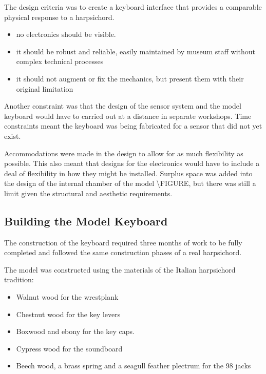 The design criteria was to create a keyboard interface that provides a
comparable physical response to a harpsichord.


\begin{itemize}
\item
  no electronics should be visible.
\item
  it should be robust and reliable, easily maintained by museum staff
  without complex technical processes
\item
  it should not augment or fix the mechanics, but present them with
  their original limitation
\end{itemize}

Another constraint was that the design of the sensor system and the
model keyboard would have to carried out at a distance in separate
workshops. Time constraints meant the keyboard was being fabricated for
a sensor that did not yet exist.

Accommodations were made in the design to allow for as much flexibility
as possible. This also meant that designs for the electronics would have
to include a deal of flexibility in how they might be installed. Surplus
space was added into the design of the internal chamber of the model
\textbackslash FIGURE, but there was still a limit given the structural
and aesthetic requirements.

\subsection{Building the Model Keyboard}\label{keyboard}

The construction of the keyboard required three months of work to be fully completed
and followed the same construction phases of a real harpsichord.

The model was constructed using the materials of the Italian harpsichord
tradition:

\begin{itemize}
\item
  Walnut wood for the wrestplank
\item
  Chestnut wood for the key levers
\item
  Boxwood and ebony for the key caps.
\item
  Cypress wood for the soundboard
\item
  Beech wood, a brass spring and a seagull feather plectrum for the 98 jacks
\end{itemize}

